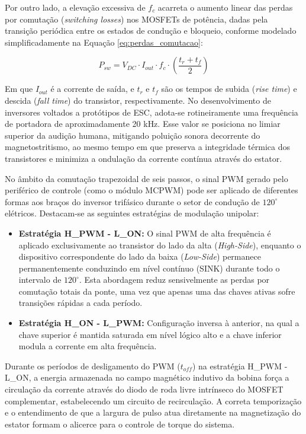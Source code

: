 Por outro lado, a elevação excessiva de $f_c$ acarreta o aumento linear das perdas por comutação (\textit{switching losses}) nos MOSFETs de potência, dadas pela transição periódica entre os estados de condução e bloqueio, conforme modelado simplificadamente na Equação \ref{eq:perdas_comutacao}:

\begin{equation}
P_{sw} = V_{DC} \cdot I_{out} \cdot f_c \cdot \left( \frac{t_r + t_f}{2} \right)
\label{eq:perdas_comutacao}
\end{equation}

Em que $I_{out}$ é a corrente de saída, e $t_r$ e $t_f$ são os tempos de subida (\textit{rise time}) e descida (\textit{fall time}) do transistor, respectivamente. No desenvolvimento de inversores voltados a protótipos de ESC, adota-se rotineiramente uma frequência de portadora de aproximadamente 20 kHz. Esse valor se posiciona no limiar superior da audição humana, mitigando poluição sonora decorrente do magnetostritismo, ao mesmo tempo em que preserva a integridade térmica dos transistores e minimiza a ondulação da corrente contínua através do estator.

No âmbito da comutação trapezoidal de seis passos, o sinal PWM gerado pelo periférico de controle (como o módulo MCPWM) pode ser aplicado de diferentes formas aos braços do inversor trifásico durante o setor de condução de $120^\circ$ elétricos. Destacam-se as seguintes estratégias de modulação unipolar:

\begin{itemize}
    \item \textbf{Estratégia H\_PWM - L\_ON:} O sinal PWM de alta frequência é aplicado exclusivamente ao transistor do lado da alta (\textit{High-Side}), enquanto o dispositivo correspondente do lado da baixa (\textit{Low-Side}) permanece permanentemente conduzindo em nível contínuo (SINK) durante todo o intervalo de $120^\circ$. Esta abordagem reduz sensivelmente as perdas por comutação totais da ponte, uma vez que apenas uma das chaves ativas sofre transições rápidas a cada período.
    \item \textbf{Estratégia H\_ON - L\_PWM:} Configuração inversa à anterior, na qual a chave superior é mantida saturada em nível lógico alto e a chave inferior modula a corrente em alta frequência.
\end{itemize}

Durante os períodos de desligamento do PWM ($t_{off}$) na estratégia H\_PWM - L\_ON, a energia armazenada no campo magnético indutivo da bobina força a circulação da corrente através do diodo de roda livre intrínseco do MOSFET complementar, estabelecendo um circuito de recirculação. A correta temporização e o entendimento de que a largura de pulso atua diretamente na magnetização do estator formam o alicerce para o controle de torque do sistema.

